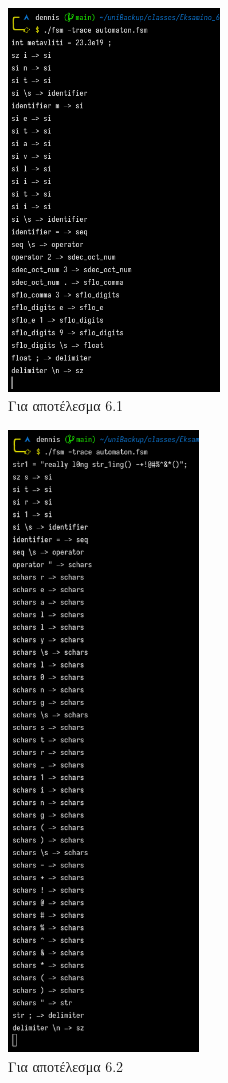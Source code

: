 \documentclass[14pt]{extarticle}
\begin{document}
\begin{figure}[h]
  \caption{Για αποτέλεσμα 6.1}
  \centering
  \includegraphics[width=0.5\textwidth]{test_metavliti}
\end{figure}

\begin{figure}[h]
  \caption{Για αποτέλεσμα 6.2}
  \centering
  \includegraphics[width=0.45\textwidth]{test_long_string}
\end{figure}
\end{document}
